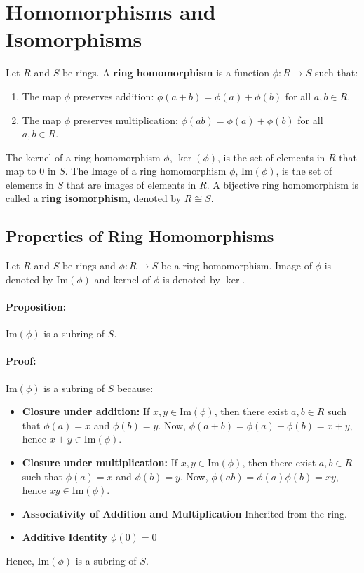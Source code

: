 \documentclass[12pt, oneside]{book}
\begin{document}
\section{Homomorphisms and Isomorphisms}
Let \(R\) and \(S\) be rings.
A \textbf{ring homomorphism} is a function \(\phi: R \to S\) such that:
\begin{enumerate}
    \item The map \(\phi\) preserves addition: \(\phi(a + b) = \phi(a) + \phi(b)\) for all \(a, b \in R\).
    \item The map \(\phi\) preserves multiplication: \(\phi(ab) = \phi(a) + \phi(b)\) for all \(a, b \in R\).
\end{enumerate}
The kernel of a ring homomorphism \(\phi\), \(\ker (\phi)\), is the set of elements in \(R\) that map to \(0\) in \(S\).
The Image of a ring homomorphism \(\phi\), \(\text{Im}(\phi)\), is the set of elements in \(S\) that are images of elements in \(R\).
A bijective ring homomorphism is called a \textbf{ring isomorphism}, denoted by \(R \cong S\).

\subsection{Properties of Ring Homomorphisms}
Let \(R\) and \(S\) be rings and \(\phi: R \to S\) be a ring homomorphism.
Image of \(\phi\) is denoted by \(\text{Im}(\phi)\) and kernel of \(\phi\) is denoted by \(\ker\).
\paragraph{Proposition:} \(\text{Im}(\phi)\) is a subring of \(S\).
\paragraph{Proof:} \(\text{Im}(\phi)\) is a subring of \(S\) because:
\begin{itemize}
    \item \textbf{Closure under addition:} If \(x, y \in \text{Im}(\phi)\), then there exist \(a, b \in R\) such that \(\phi(a) = x\) and \(\phi(b) = y\).
    Now, \(\phi(a + b) = \phi(a) + \phi(b) = x + y\), hence \(x + y \in \text{Im}(\phi)\).
    \item \textbf{Closure under multiplication:} If \(x, y \in \text{Im}(\phi)\), then there exist \(a, b \in R\) such that \(\phi(a) = x\) and \(\phi(b) = y\).
    Now, \(\phi(ab) = \phi(a)\phi(b) = xy\), hence \(xy \in \text{Im}(\phi)\).
    \item \textbf{Associativity of Addition and Multiplication} Inherited from the ring.
    \item \textbf{Additive Identity} \(\phi(0) = 0\)
\end{itemize}
Hence, \(\text{Im}(\phi)\) is a subring of \(S\).
\end{document}
